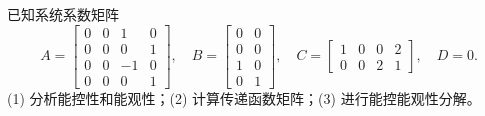 \documentclass[11pt]{article}
\begin{document}

\begin{problem}[原题 1(c)]
已知系统系数矩阵
\[
A=\begin{bmatrix}0&0&1&0\\0&0&0&1\\0&0&-1&0\\0&0&0&1\end{bmatrix},\quad
B=\begin{bmatrix}0&0\\0&0\\1&0\\0&1\end{bmatrix},\quad
C=\begin{bmatrix}1&0&0&2\\0&0&2&1\end{bmatrix},\quad D=0.
\]
(1) 分析能控性和能观性；(2) 计算传递函数矩阵；(3) 进行能控能观性分解。
\end{problem}
\end{document}
